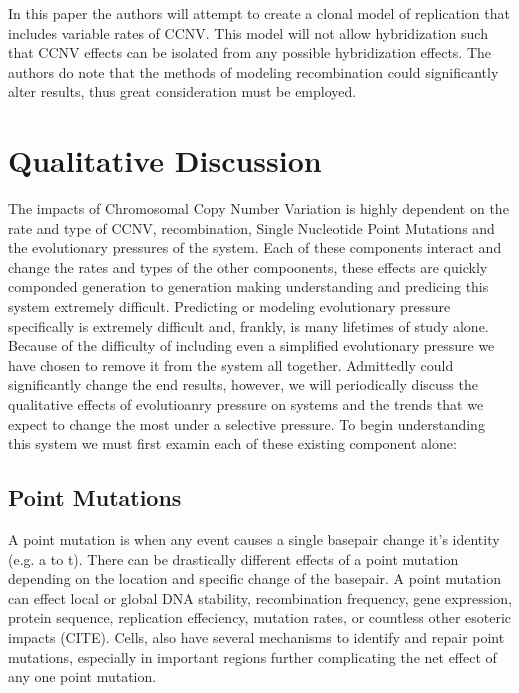 \documentclass{article}
\begin{document}
    In this paper the authors will attempt to create a clonal model of replication that includes variable rates of CCNV.  This model will not allow hybridization such that CCNV effects can be isolated from any possible hybridization effects.  The authors do note that the methods of modeling recombination could significantly alter results, thus great consideration must be employed.

    \section{Qualitative Discussion}

    The impacts of Chromosomal Copy Number Variation is highly dependent on the rate and type of CCNV, recombination, Single Nucleotide Point Mutations and the evolutionary pressures of the system.  Each of these components interact and change the rates and types of the other compoonents, these effects are quickly componded generation to generation making understanding and predicing this system extremely difficult.  Predicting or modeling evolutionary pressure specifically is extremely difficult and, frankly, is many lifetimes of study alone.  Because of the difficulty of including even a simplified evolutionary pressure we have chosen to remove it from the system all together.  Admittedly could significantly change the end results, however, we will periodically discuss the qualitative effects of evolutioanry pressure on systems and the trends that we expect to change the most under a selective pressure.  To begin understanding this system we must first examin each of these existing component alone:



    \subsection{Point Mutations}
    A point mutation is when any event causes a single basepair change it's identity (e.g. a to t).  There can be drastically different effects of a point mutation depending on the location and specific change of the basepair.  A point mutation can effect local or global DNA stability, recombination frequency, gene expression, protein sequence, replication effeciency, mutation rates, or countless other esoteric impacts (CITE).  Cells, also have several mechanisms to identify and repair point mutations, especially in important regions further complicating the net effect of any one point mutation.
    
\end{document}
